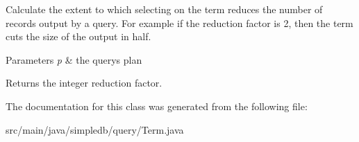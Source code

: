 Calculate the extent to which selecting on the term reduces the number of records output by a query. For example if the reduction factor is 2, then the term cuts the size of the output in half. 
\begin{DoxyParams}{Parameters}
{\em p} & the query\textquotesingle{}s plan \\
\hline
\end{DoxyParams}
\begin{DoxyReturn}{Returns}
the integer reduction factor. 
\end{DoxyReturn}


The documentation for this class was generated from the following file\+:\begin{DoxyCompactItemize}
\item 
src/main/java/simpledb/query/Term.\+java\end{DoxyCompactItemize}
